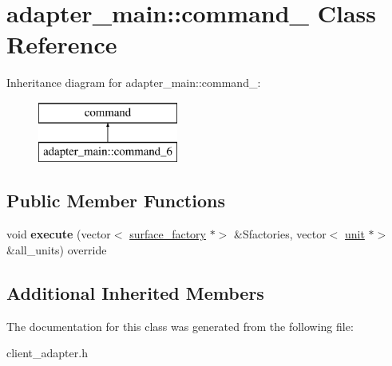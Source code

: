 \hypertarget{classadapter__main_1_1command__6}{}\section{adapter\+\_\+main\+:\+:command\+\_ Class Reference}
\label{classadapter__main_1_1command__6}
Inheritance diagram for adapter\+\_\+main\+:\+:command\+\_\+:\begin{figure}[H]
\begin{center}
\leavevmode
\includegraphics[height=2.000000cm]{classadapter__main_1_1command__6}
\end{center}
\end{figure}
\subsection*{Public Member Functions}
\begin{DoxyCompactItemize}
\item 
\mbox{\label{classadapter__main_1_1command__6_a2c084b732f91f56576d4bbaef9835380}} 
void {\bfseries execute} (vector$<$ \mbox{\hyperlink{classsurface__factory}{surface\+\_\+factory}} $\ast$$>$ \&Sfactories, vector$<$ \mbox{\hyperlink{classunit}{unit}} $\ast$$>$ \&all\+\_\+units) override
\end{DoxyCompactItemize}
\subsection*{Additional Inherited Members}


The documentation for this class was generated from the following file\+:\begin{DoxyCompactItemize}
\item 
client\+\_\+adapter.\+h\end{DoxyCompactItemize}
